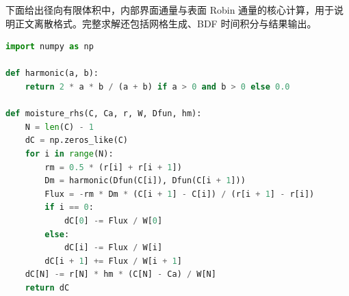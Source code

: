\vspace{1.1em}

下面给出径向有限体积中，内部界面通量与表面 Robin 通量的核心计算，用于说明正文离散格式。完整求解还包括网格生成、BDF 时间积分与结果输出。

\begin{lstlisting}[language=Python]
import numpy as np

def harmonic(a, b):
    return 2 * a * b / (a + b) if a > 0 and b > 0 else 0.0

def moisture_rhs(C, Ca, r, W, Dfun, hm):
    N = len(C) - 1
    dC = np.zeros_like(C)
    for i in range(N):
        rm = 0.5 * (r[i] + r[i + 1])
        Dm = harmonic(Dfun(C[i]), Dfun(C[i + 1]))
        Flux = -rm * Dm * (C[i + 1] - C[i]) / (r[i + 1] - r[i])
        if i == 0:
            dC[0] -= Flux / W[0]
        else:
            dC[i] -= Flux / W[i]
        dC[i + 1] += Flux / W[i + 1]
    dC[N] -= r[N] * hm * (C[N] - Ca) / W[N]
    return dC
\end{lstlisting}
